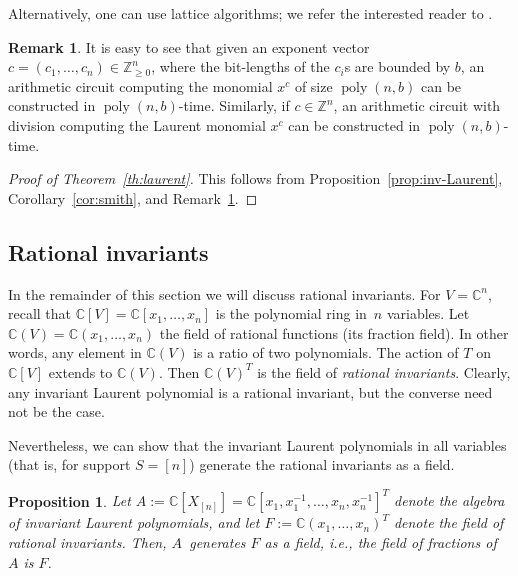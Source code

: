 \documentclass[10pt,a4paper]{article}
\DeclareMathOperator{\poly}{poly}
\newtheorem{proposition}[theorem]{Proposition}
\theoremstyle{definition}
\newtheorem{remark}[theorem]{Remark}
\numberwithin{equation}{section}
\newcommand{\CC}{\mathbb{C}}
\newcommand{\ZZ}{\mathbb{Z}}
\begin{document}
Alternatively, one can use lattice algorithms; we refer the interested reader to \cite[Corollary~5.4.10]{GLS-book}.

\begin{remark}\label{rmk:easy-circuit}
It is easy to see that given an exponent vector $c = (c_1,\dots,c_n) \in \ZZ_{\ge 0}^n$, where the bit-lengths of the $c_i$s are bounded by $b$, an arithmetic circuit computing the monomial $x^c$ of size $\poly(n,b)$ can be constructed in $\poly(n,b)$-time.
Similarly, if $c\in \ZZ^n$, an arithmetic circuit with division computing the Laurent monomial $x^c$ can be constructed in $\poly(n,b)$-time.
\end{remark}

\begin{proof}[Proof of Theorem~\ref{th:laurent}]
This follows from Proposition~\ref{prop:inv-Laurent}, Corollary~\ref{cor:smith}, and Remark~\ref{rmk:easy-circuit}.
\end{proof}

%
\subsection{Rational invariants}\label{se:rational}
%
In the remainder of this section we will discuss rational invariants.
For $V = \CC^n$, recall that $\CC[V] = \CC[x_1,\dots,x_n]$ is the polynomial ring in~$n$ variables.
Let $\CC(V) = \CC(x_1,\dots,x_n)$ the field of rational functions (its fraction field).
In other words, any element in $\CC(V)$ is a ratio of two polynomials.
The action of $T$ on $\CC[V]$ extends to $\CC(V)$.
Then $\CC(V)^T$ is the field of \emph{rational invariants}.
Clearly, any invariant Laurent polynomial is a rational invariant, but the converse need not be the case.

Nevertheless, we can show that the invariant Laurent polynomials in all variables (that is, for support $S=[n]$) generate the rational invariants as a field.

\begin{proposition}\label{pro:rat}
Let $A := \CC[X_{[n]}] = \CC[x_1,x_1^{-1},\dots,x_n,x_n^{-1}]^T$ denote the algebra of invariant Laurent polynomials,
and let $F := \CC(x_1,\dots,x_n)^T$ denote the field of rational invariants.
Then, $A$~generates $F$ as a field, i.e., the field of fractions of $A$ is $F$.
\end{proposition}
\end{document}
